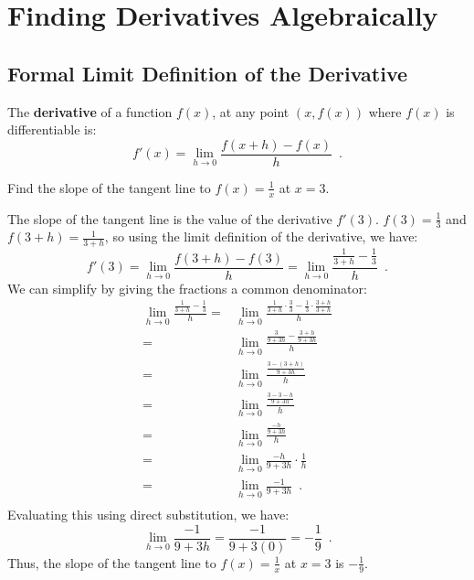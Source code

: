 \section{Finding Derivatives Algebraically}
\label{sec:algderiv}

\subsection{Formal Limit Definition of the Derivative}

\begin{definition}
\label{def:deriv}
The {\bf derivative} of a function $f(x)$, at any point $(x, f(x))$ where $f(x)$ is differentiable is:
$$f'(x)=\lim_{h\to 0}\frac{f(x+h)-f(x)}{h} \enspace .$$
\end{definition}

\begin{example}
Find the slope of the tangent line to $f(x)=\frac{1}{x}$ at $x=3$.

\begin{solution} The slope of the tangent line is the value of the derivative $f'(3)$. $f(3)=\frac{1}{3}$ and $f(3+h)=\frac{1}{3+h}$, so using the limit definition of the derivative, we have:
$$f'(3)=\lim_{h\to 0}\frac{f(3+h)-f(3)}{h}=\lim_{h\to 0}\frac{\frac{1}{3+h}-\frac{1}{3}}{h} \enspace .$$
We can simplify by giving the fractions a common denominator:
\begin{align*}
		\lim_{h\to 0}\frac{\frac{1}{3+h}-\frac{1}{3}}{h}=& \lim_{h\to 0}\frac{\frac{1}{3+h}\cdot\frac{3}{3}-\frac{1}{3}\cdot\frac{3+h}{3+h}}{h} \\
		=& \lim_{h\to 0}\frac{\frac{3}{9+3h}-\frac{3+h}{9+3h}}{h} \\
		=& \lim_{h\to 0}\frac{\frac{3-(3+h)}{9+3h}}{h} \\
		=& \lim_{h\to 0}\frac{\frac{3-3-h}{9+3h}}{h} \\
		=& \lim_{h\to 0}\frac{\frac{-h}{9+3h}}{h} \\
		=& \lim_{h\to 0}\frac{-h}{9+3h}\cdot\frac{1}{h} \\
		=& \lim_{h\to 0}\frac{-1}{9+3h} \enspace .\\
	\end{align*}
Evaluating this using direct substitution, we have:
$$\lim_{h\to 0}\frac{-1}{9+3h}=\frac{-1}{9+3(0)}=-\frac{1}{9} \enspace.$$
Thus, the slope of the tangent line to $f(x)=\frac{1}{x}$ at $x=3$ is $-\frac{1}{9}$.
\end{solution}\end{example}

